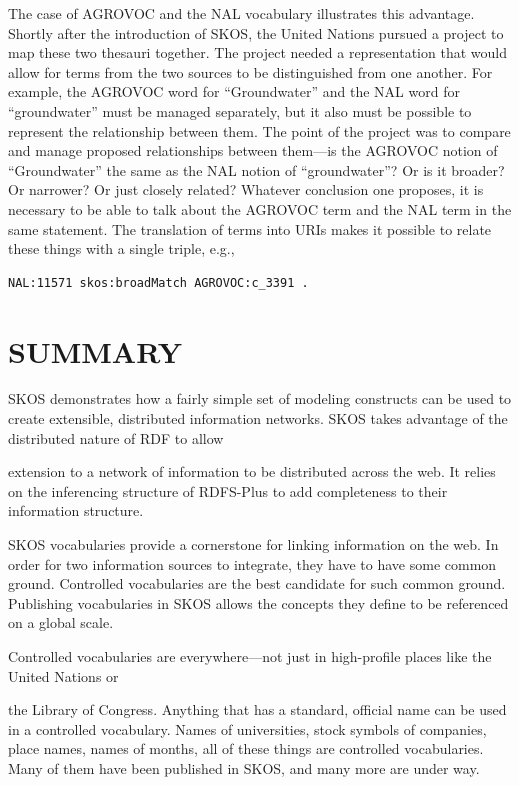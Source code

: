 The case of AGROVOC and the NAL vocabulary illustrates this advantage.
Shortly after the introduction of SKOS, the United Nations pursued a
project to map these two thesauri together. The project needed a
representation that would allow for terms from the two sources to be
distinguished from one another. For example, the AGROVOC word for
``Groundwater'' and the NAL word for ``groundwater'' must be managed
separately, but it also must be possible to represent the relationship
between them. The point of the project was to compare and manage
proposed relationships between them---is the AGROVOC notion of
``Groundwater'' the same as the NAL notion of ``groundwater''? Or is it
broader? Or narrower? Or just closely related? Whatever conclusion one
proposes, it is necessary to be able to talk about the AGROVOC term and
the NAL term in the same statement. The translation of terms into URIs
makes it possible to relate these things with a single triple, e.g.,

\begin{lstlisting}
NAL:11571 skos:broadMatch AGROVOC:c_3391 .
\end{lstlisting}

\section{SUMMARY}

SKOS demonstrates how a fairly simple set of modeling constructs can be
used to create extensible, distributed information networks. SKOS takes
advantage of the distributed nature of RDF to allow

extension to a network of information to be distributed across the web.
It relies on the inferencing structure of RDFS-Plus to add completeness
to their information structure.

SKOS vocabularies provide a cornerstone for linking information on the
web. In order for two information sources to integrate, they have to
have some common ground. Controlled vocabularies are the best candidate
for such common ground. Publishing vocabularies in SKOS allows the
concepts they define to be referenced on a global scale.

Controlled vocabularies are everywhere---not just in high-profile places
like the United Nations or

the Library of Congress. Anything that has a standard, official name can
be used in a controlled vocabulary. Names of universities, stock symbols
of companies, place names, names of months, all of these things are
controlled vocabularies. Many of them have been published in SKOS, and
many more are under way.

